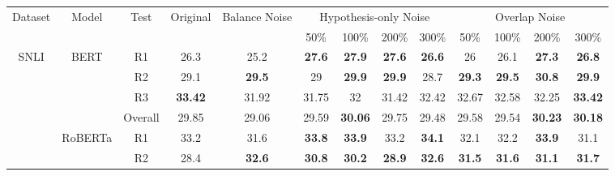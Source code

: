 \begin{table}[]
\centering
	\scriptsize
\begin{tabular}{|c|c|c|c|c|c|c|c|c|c|c|c|c|}
\hline
\multirow{2}{*}{Dataset} & \multirow{2}{*}{Model}   & \multirow{2}{*}{Test} & \multirow{2}{*}{Original} & \multirow{2}{*}{Balance Noise} & \multicolumn{4}{c|}{Hypothesis-only Noise}                        & \multicolumn{4}{c|}{Overlap Noise}                                \\ \cline{6-13} 
                         &                          &                       &                           &                                & 50\%           & 100\%          & 200\%          & 300\%          & 50\%           & 100\%          & 200\%          & 300\%          \\ \hline
\multirow{8}{*}{SNLI}    & \multirow{4}{*}{BERT}    & R1                    & 26.3                      & 25.2                           & \textbf{27.6}  & \textbf{27.9}  & \textbf{27.6}  & \textbf{26.6}  & 26             & 26.1           & \textbf{27.3}  & \textbf{26.8}  \\ \cline{3-13} 
                         &                          & R2                    & 29.1                      & \textbf{29.5}                  & 29             & \textbf{29.9}  & \textbf{29.9}  & 28.7           & \textbf{29.3}  & \textbf{29.5}  & \textbf{30.8}  & \textbf{29.9}  \\ \cline{3-13} 
                         &                          & R3                    & \textbf{33.42}            & 31.92                          & 31.75          & 32             & 31.42          & 32.42          & 32.67          & 32.58          & 32.25          & \textbf{33.42} \\ \cline{3-13} 
                         &                          & Overall               & 29.85                     & 29.06                          & 29.59          & \textbf{30.06} & 29.75          & 29.48          & 29.58          & 29.54          & \textbf{30.23} & \textbf{30.18} \\ \cline{2-13} 
                         & \multirow{4}{*}{RoBERTa} & R1                    & 33.2                      & 31.6                           & \textbf{33.8}  & \textbf{33.9}  & 33.2           & \textbf{34.1}  & 32.1           & 32.2           & \textbf{33.9}  & 31.1           \\ \cline{3-13} 
                         &                          & R2                    & 28.4                      & \textbf{32.6}                  & \textbf{30.8}  & \textbf{30.2}  & \textbf{28.9}  & \textbf{32.6}  & \textbf{31.5}  & \textbf{31.6}  & \textbf{31.1}  & \textbf{31.7}  \\ \cline{3-13} 

\end{tabular}
\end{table}
